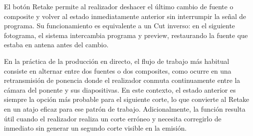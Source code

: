 El botón Retake permite al realizador deshacer el último cambio de fuente o composite y
volver al estado inmediatamente anterior sin interrumpir la señal de programa. Su
funcionamiento es equivalente a un Cut inverso: en el siguiente fotograma, el sistema
intercambia programa y preview, restaurando la fuente que estaba en antena antes del
cambio.

En la práctica de la producción en directo, el flujo de trabajo más habitual consiste
en alternar entre dos fuentes o dos composites, como ocurre en una retransmisión de
ponencia donde el realizador conmuta continuamente entre la cámara del ponente y sus
diapositivas. En este contexto, el estado anterior es siempre la opción más probable
para el siguiente corte, lo que convierte al Retake en un atajo eficaz para ese patrón
de trabajo. Adicionalmente, la función resulta útil cuando el realizador realiza un
corte erróneo y necesita corregirlo de inmediato sin generar un segundo corte visible
en la emisión.

